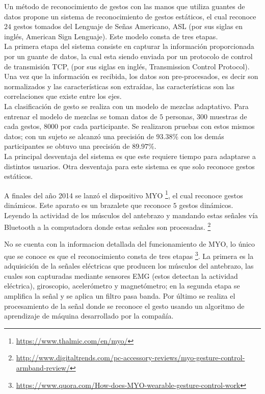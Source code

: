 Un método de reconocimiento de gestos con las manos que utiliza guantes de datos \citep{Yoon2012} propone un sistema de reconocimiento de gestos estáticos, el cual reconoce $24$ gestos tomados del Lenguaje de Señas Americano, ASL (por sus siglas en inglés, American Sign Lenguaje). Este modelo consta de tres etapas. \\
La primera etapa del sistema consiste en capturar la información proporcionada por un guante de datos, la cual esta siendo enviada por un protocolo de control de transmisión TCP, (por sus siglas en inglés, Transmission Control Protocol).\\  
Una vez que la información es recibida, los datos son pre-procesados, es decir son normalizados y las características son extraídas, las características son las correlaciones que existe entre los ejes.\\     
La clasificación de gesto se realiza con un modelo de mezclas adaptativo. Para entrenar el modelo de mezclas se toman datos de $5$ personas, $300$ muestras de cada gestos, $8000$ por cada participante. Se realizaron pruebas con estos mismos datos; con un sujeto se alcanzó una precisión de $93.38 \%$ con los demás participantes se obtuvo una precisión de $89.97 \%$.\\  
La principal desventaja del sistema es que este requiere tiempo para adaptarse a distintos usuarios. Otra desventaja para este sistema es que solo reconoce gestos estáticos. 

A finales del año 2014 se lanzó el dispositivo MYO \footnote{\url{https://www.thalmic.com/en/myo/}}, el cual reconoce gestos dinámicos. Este aparato es un brazalete que reconoce $5$ gestos dinámicos. Leyendo la actividad de los músculos del antebrazo y mandando estas señales vía Bluetooth a la computadora donde estas señales son procesadas. \footnote{\url{http://www.digitaltrends.com/pc-accessory-reviews/myo-gesture-control-armband-review/}} 

No se cuenta con la informacion detallada del funcionamiento de MYO, lo único que se conoce es que el reconocimiento consta de tres etapas \footnote{\url{https://www.quora.com/How-does-MYO-wearable-gesture-control-work}}. La primera es la adquisición de la señales eléctricas que producen los músculos del antebrazo, las cuales son capturadas mediante sensores EMG (estos detectan la actividad eléctrica), giroscopio, acelerómetro y magnetómetro; en la segunda etapa se amplifica la señal y se aplica un filtro pasa banda. Por último se realiza el procesamiento de la señal donde se reconoce el gesto usando un algoritmo de aprendizaje de máquina desarrollado por la compañía.  

